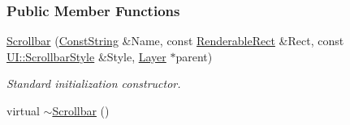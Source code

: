 \subsubsection*{Public Member Functions}
\begin{DoxyCompactItemize}
\item 
\hyperlink{classMezzanine_1_1UI_1_1Scrollbar_a7abd0409147721d1557d20756496baa8}{Scrollbar} (\hyperlink{namespaceMezzanine_a63cd699ac54b73953f35ec9cfc05e506}{ConstString} \&Name, const \hyperlink{structMezzanine_1_1UI_1_1RenderableRect}{RenderableRect} \&Rect, const \hyperlink{namespaceMezzanine_1_1UI_a5998a9bf372a7e92605c0c461736e763}{UI::ScrollbarStyle} \&Style, \hyperlink{classMezzanine_1_1UI_1_1Layer}{Layer} $\ast$parent)
\begin{DoxyCompactList}\small\item\em Standard initialization constructor. \item\end{DoxyCompactList}\item 
\hypertarget{classMezzanine_1_1UI_1_1Scrollbar_a37a3624127018fcfbcac521a84de926f}{
virtual \hyperlink{classMezzanine_1_1UI_1_1Scrollbar_a37a3624127018fcfbcac521a84de926f}{$\sim$Scrollbar} ()}
\label{classMezzanine_1_1UI_1_1Scrollbar_a37a3624127018fcfbcac521a84de926f}


\end{DoxyCompactItemize}
